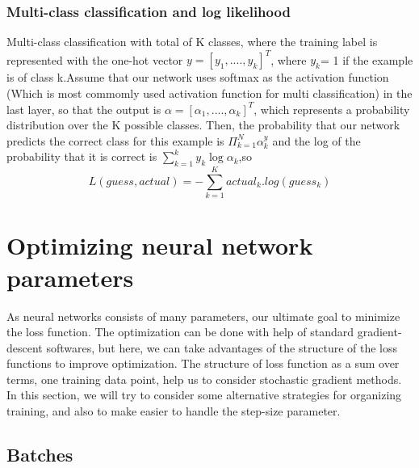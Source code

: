 \subsubsection{Multi-class classification and log likelihood}
Multi-class classification with total of K classes, where the training label is represented with the one-hot vector $y = [y_1,...., y_k]^T$, where $y_k$= 1 if the example is of class k.Assume that our network uses softmax as the activation function (Which is most commomly used activation function for multi classification) in the last layer, so that the output is
$\alpha = [\alpha_1,....,\alpha_k]^T$, which represents a probability
distribution over the K possible classes. Then, the probability that our network predicts
the correct class for this example is $\Pi_{k=1} ^N \alpha_k ^y$ and the log of the probability that it is correct is $\sum_{k=1} ^k y_k \log \alpha_k$,so
\begin{equation*}
    L(guess, actual) = - \sum_{k=1} ^K actual_k.log(guess_k)
\end{equation*}





\section{Optimizing neural network parameters}
As neural networks consists of many parameters, our ultimate goal to minimize the loss function. The optimization can be done with help of standard gradient-descent softwares, but here, we can take advantages of the structure of the loss functions to improve optimization. The structure of loss function as a sum over terms, one training data point, help us to consider stochastic gradient methods. In this section, we will try to consider some alternative strategies for organizing training, and also to make easier to handle the step-size parameter.\\


\subsection{Batches}

